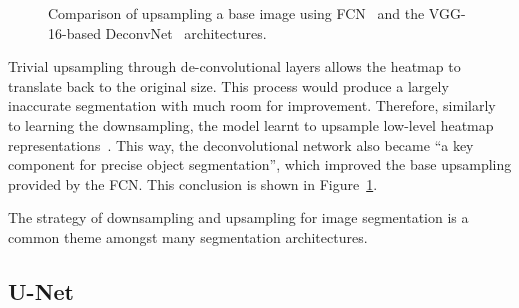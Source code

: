 \documentclass[11pt,twoside]{report}
\begin{document}
\begin{figure}[H]
  \centering
  \caption{Comparison of upsampling a base image using FCN~\cite{fully-CNNs-for-semantic-segmentation} and the VGG-16-based DeconvNet~\cite{noh2015learning, simonyan2014very} architectures.}\label{fig:fcn-vs-deconvnet}
\end{figure}


Trivial upsampling through de-convolutional layers allows the heatmap to translate back to the original size. This process would produce a largely inaccurate segmentation with much room for improvement. Therefore, similarly to learning the downsampling, the model learnt to upsample low-level heatmap representations~\cite{noh2015learning}. This way, the deconvolutional network also became ``a key component for precise object segmentation'', which improved the base upsampling provided by the FCN. This conclusion is shown in Figure~\ref{fig:fcn-vs-deconvnet}.

The strategy of downsampling and upsampling for image segmentation is a common theme amongst many segmentation architectures.

\subsection{U-Net}
\end{document}
